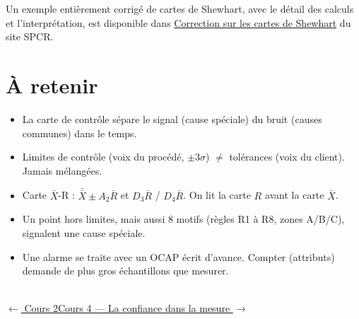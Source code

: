 \documentclass[11pt]{article}
\begin{document}
\begin{plusloin}
Un exemple entièrement corrigé de cartes de Shewhart, avec le détail des calculs et l'interprétation, est disponible dans \href{https://sjaubert.github.io/SPCR/TP_cartes_Shewhart.html}{Correction sur les cartes de Shewhart} du site SPCR.
\end{plusloin}

\section*{\color{uimmblue}À retenir}
\begin{itemize}
\item La carte de contrôle sépare le signal (cause spéciale) du bruit (causes communes) dans le temps.
\item Limites de contrôle (voix du procédé, $\pm 3\sigma$) $\ne$ tolérances (voix du client). Jamais mélangées.
\item Carte $\bar{X}$-R : $\bar{\bar{X}} \pm A_2\bar{R}$ et $D_3\bar{R}$ / $D_4\bar{R}$. On lit la carte $R$ avant la carte $\bar{X}$.
\item Un point hors limites, mais aussi 8 motifs (règles R1 à R8, zones A/B/C), signalent une cause spéciale.
\item Une alarme se traite avec un OCAP écrit d'avance. Compter (attributs) demande de plus gros échantillons que mesurer.
\end{itemize}

\vfill
\noindent\hrulefill\\[2pt]
{\footnotesize\color{uimmgrey}\href{2_La_Capabilite.pdf}{$\leftarrow$ Cours 2}\qquad\qquad\href{4_La_Confiance_dans_la_Mesure_MSA.pdf}{Cours 4 — La confiance dans la mesure $\rightarrow$}}
\end{document}
